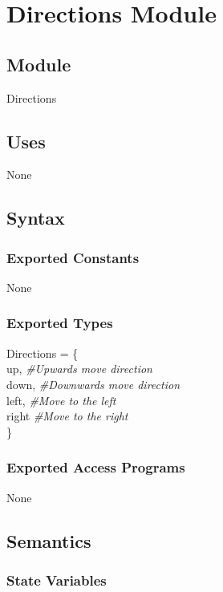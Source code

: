 \documentclass[12pt]{article}
\begin{document}
\newpage

\section* {Directions Module}

\subsection*{Module}

Directions

\subsection* {Uses}

None

\subsection* {Syntax}

\subsubsection* {Exported Constants}

None

\subsubsection* {Exported Types}

Directions = \{\\
    up, \textit{\#Upwards move direction}\\
    down, \textit{\#Downwards move direction}\\
    left, \textit{\#Move to the left}\\
    right \textit{\#Move to the right}\\
\}

\subsubsection* {Exported Access Programs}

None

\subsection* {Semantics}

\subsubsection* {State Variables}
\end{document}
